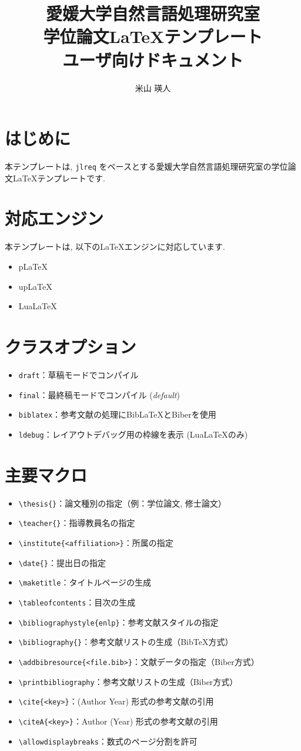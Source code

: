 \documentclass{ltjsarticle}
\title{愛媛大学自然言語処理研究室\\学位論文{\LaTeX}テンプレート\\ユーザ向けドキュメント}
\author{米山 瑛人}
\newcommand{\pkg}[1]{\texttt{#1}}
\newcommand{\cs}[1]{\texttt{\textbackslash#1}}
\begin{document}
\maketitle
\tableofcontents
\clearpage
\section{はじめに}
本テンプレートは, \pkg{jlreq} をベースとする愛媛大学自然言語処理研究室の学位論文LaTeXテンプレートです.
\section{対応エンジン}
本テンプレートは, 以下のLaTeXエンジンに対応しています.
\begin{itemize}
    \item p\LaTeX
    \item up\LaTeX
    \item Lua\LaTeX
\end{itemize}
\section{クラスオプション}
\begin{itemize}
    \item \texttt{draft}：草稿モードでコンパイル
    \item \texttt{final}：最終稿モードでコンパイル (\textit{default})
    \item \texttt{biblatex}：参考文献の処理にBibLaTeXとBiberを使用
    \item \texttt{ldebug}：レイアウトデバッグ用の枠線を表示 (LuaLaTeXのみ)
\end{itemize}
\section{主要マクロ}
\begin{itemize}
    \item \cs{thesis\{<paper type>\}}：論文種別の指定（例：学位論文, 修士論文）
    \item \cs{teacher\{<teacher name>\}}：指導教員名の指定
    \item \cs{institute\{<affiliation>\}}：所属の指定
    \item \cs{date\{<submission date>\}}：提出日の指定
    \item \cs{maketitle}：タイトルページの生成
    \item \cs{tableofcontents}：目次の生成
    \item \cs{bibliographystyle\{enlp\}}：参考文献スタイルの指定
    \item \cs{bibliography\{<bibtex file>\}}：参考文献リストの生成（BibTeX方式）
    \item \cs{addbibresource\{<file.bib>\}}：文献データの指定（Biber方式）
    \item \cs{printbibliography}：参考文献リストの生成（Biber方式）
    \item \cs{cite\{<key>\}}：(Author Year) 形式の参考文献の引用
    \item \cs{citeA\{<key>\}}：Author (Year) 形式の参考文献の引用
    \item \cs{allowdisplaybreaks}：数式のページ分割を許可
\end{itemize}
\end{document}
